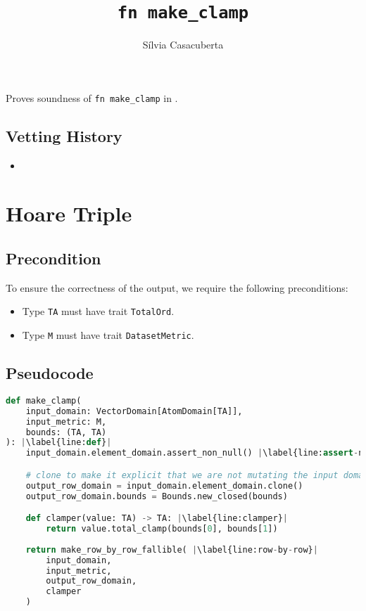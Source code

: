 \documentclass{article}
\title{\texttt{fn make\_clamp}}
\author{S\'ilvia Casacuberta}
\date{}
\begin{document}
\maketitle

\contrib
Proves soundness of \texttt{fn make\_clamp} in .

\subsection*{Vetting History}
\begin{itemize}
    \item {}
\end{itemize}

\section{Hoare Triple}
\subsection*{Precondition}
To ensure the correctness of the output, we require the following preconditions:

\begin{itemize}
    \item Type \texttt{TA} must have trait \texttt{TotalOrd}.
    \item Type \texttt{M} must have trait \texttt{DatasetMetric}.
\end{itemize}

\subsection*{Pseudocode}
\begin{lstlisting}[language=Python, escapechar=|] 
def make_clamp(
    input_domain: VectorDomain[AtomDomain[TA]], 
    input_metric: M, 
    bounds: (TA, TA)
): |\label{line:def}|
    input_domain.element_domain.assert_non_null() |\label{line:assert-non-null}|

    # clone to make it explicit that we are not mutating the input domain
    output_row_domain = input_domain.element_domain.clone()
    output_row_domain.bounds = Bounds.new_closed(bounds)

    def clamper(value: TA) -> TA: |\label{line:clamper}|
        return value.total_clamp(bounds[0], bounds[1])
    
    return make_row_by_row_fallible( |\label{line:row-by-row}|
        input_domain, 
        input_metric, 
        output_row_domain, 
        clamper
    )
\end{lstlisting}
\end{document}
